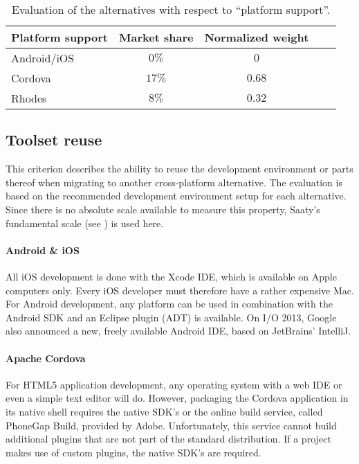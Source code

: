 \begin{table}[h!]
    \begin{center}
        \begin{tabular}{lcccl}
            \hline
            \textbf{Platform support} & Market share & Normalized weight \\
            \hline
            Android/iOS               & $0\%$        & $0$         \\
            Cordova                   & $17\%$       & $0.68$      \\
            Rhodes                    & $8\%$        & $0.32$      \\
            \hline
        \end{tabular}
        \caption{Evaluation of the alternatives with respect to ``platform support''.}
        \label{tab:ps}
    \end{center}
\end{table}

\subsection{Toolset reuse}

This criterion describes the ability to reuse the development environment or parts thereof when migrating to another cross-platform alternative. The evaluation is based on the recommended development environment setup for each alternative. Since there is no absolute scale available to measure this property, Saaty's fundamental scale (see ) is used here.

\paragraph{Android \& iOS} All iOS development is done with the Xcode IDE, which is available on Apple computers only. Every iOS developer must therefore have a rather expensive Mac. For Android development, any platform can be used in combination with the Android SDK and an Eclipse plugin (ADT) is available. On I/O 2013, Google also announced a new, freely available Android IDE, based on JetBrains' IntelliJ.

\paragraph{Apache Cordova} For HTML5 application development, any operating system with a web IDE or even a simple text editor will do. However, packaging the Cordova application in its native shell requires the native SDK's or the online build service, called PhoneGap Build, provided by Adobe. Unfortunately, this service cannot build additional plugins that are not part of the standard distribution. If a project makes use of custom plugins, the native SDK's are required. 

